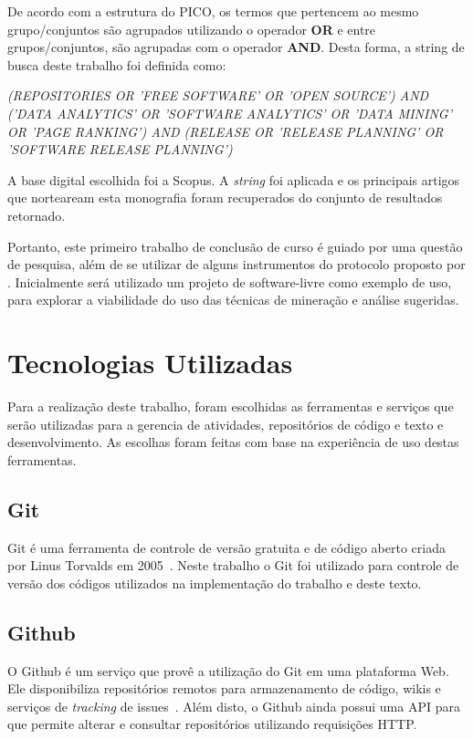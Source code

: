 De acordo com a estrutura do PICO, os termos que pertencem ao mesmo grupo/conjuntos são agrupados utilizando o operador \textbf{OR} e entre grupos/conjuntos, são agrupadas com o operador \textbf{AND}. Desta forma, a string de busca deste trabalho foi definida como:


\begin{center}
        \textit{(REPOSITORIES OR 'FREE SOFTWARE' OR 'OPEN SOURCE') AND ('DATA ANALYTICS' OR 'SOFTWARE ANALYTICS' OR 'DATA MINING' OR 'PAGE RANKING') AND (RELEASE OR 'RELEASE PLANNING' OR 'SOFTWARE RELEASE PLANNING')}
\end{center}

A base digital escolhida foi a Scopus. A \textit{string} foi aplicada e os principais artigos que norteaream esta monografia foram recuperados do conjunto de resultados retornado.

Portanto, este primeiro trabalho de conclusão de curso é guiado por uma questão de pesquisa, além de se utilizar de alguns instrumentos do protocolo proposto por . Inicialmente será utilizado um projeto de software-livre como exemplo de uso, para explorar a viabilidade do uso das técnicas de mineração e análise sugeridas. 

\section{Tecnologias Utilizadas}
\label{met:tec}
Para a realização deste trabalho, foram escolhidas as ferramentas e serviços que serão utilizadas para a gerencia de atividades, repositórios de código e texto e desenvolvimento. As escolhas foram feitas com base na experiência de uso destas ferramentas.

\subsection{Git}
\label{met:tec:git}
Git é uma ferramenta de controle de versão gratuita e de código aberto criada por Linus Torvalds em 2005~\cite{chacon}. Neste trabalho o Git foi utilizado para controle de versão dos códigos utilizados na implementação do trabalho e deste texto.

\subsection{Github}
\label{met:tec:github}
O Github é um serviço que provê a utilização do Git em uma plataforma Web. Ele disponibiliza repositórios remotos para armazenamento de código, wikis e serviços de \textit{tracking} de issues~\cite{github}. Além disto, o Github ainda possui uma API para que permite alterar e consultar repositórios utilizando requisições HTTP.

